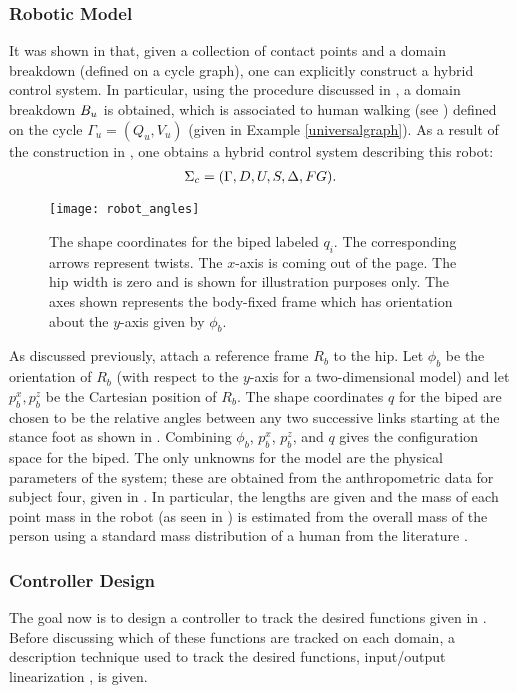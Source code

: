 \subsubsection{Robotic Model} It was shown in  that, given a collection of contact points and a domain breakdown (defined on a cycle graph), one can explicitly construct a hybrid control system. In particular, using the procedure discussed in , a domain breakdown $B_u$ is obtained, which is associated to human walking (see ) defined on the cycle $\Gamma_u = (Q_u,V_u)$ (given in Example \ref{universalgraph}).  As a result of the construction in , one obtains a hybrid control system describing this robot:
\begin{align}
  \label{eq:hcstime}
  \Sigma_{c} = (\Gamma, D, U, S, \Delta, FG).
\end{align}
%
\begin{figure}[t!]
  \centering
  \texttt{[image: robot\_angles]}
  \caption[The shape coordinates for the biped labeled $q_i$.]{The shape
    coordinates for the biped labeled $q_i$.
    The corresponding arrows represent twists. The $x$-axis is coming out of the
    page.
    The hip width is zero and is shown for illustration purposes only.
    The axes shown represents the body-fixed frame which has orientation about
    the $y$-axis given by $\phi_b$.}
  \label{fig:shapecoords}
\end{figure}
%
As discussed previously, attach a reference frame $R_b$ to the hip. Let $\phi_b$
be the orientation of $R_b$ (with respect to the $y$-axis for a two-dimensional
model) and let $p_b^x, p_b^z$ be the Cartesian position of $R_b$.
%
The shape coordinates $q$ for the biped are chosen to be the relative angles
between any two successive links starting at the stance foot as shown in
.
%
Combining $\phi_b$, $p_b^x$, $p_b^z$, and $q$ gives the configuration space for
the biped.
%
The only unknowns for the model are the physical parameters of the system;
%
these are obtained from the anthropometric data for subject four, given in
.
%
In particular, the lengths are given and the mass of each point mass in the
robot (as seen in ) is estimated from the overall
mass of the person using a standard mass distribution of a human from the
literature \cite{Winter2009}.

\subsubsection{Controller Design}
The goal now is to design a controller to track the desired functions given in
.
%
Before discussing which of these functions are tracked on each domain, a
description technique used to track the desired functions, input/output
linearization \cite[Ch.~9]{Sastry1999}, is given. %

